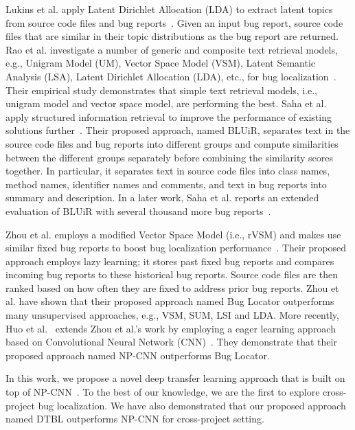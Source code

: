 \vspace{0.2cm} Lukins et al. apply Latent Dirichlet Allocation (LDA) to extract latent topics from source code files and bug reports~\cite{lukins2008source}. Given an input bug report, source code files that are similar in their topic distributions as the bug report are returned. Rao et al. investigate a number of generic and composite text retrieval models, e.g., Unigram Model (UM), Vector Space Model (VSM), Latent Semantic Analysis (LSA), Latent Dirichlet Allocation (LDA), etc., for bug localization~\cite{rao2011retrieval}. Their empirical study demonstrates that simple text retrieval models, i.e., unigram model and vector space model, are performing the best. Saha et al. apply structured information retrieval to improve the performance of existing solutions further~\cite{SahaLKP13}. Their proposed approach, named BLUiR, separates text in the source code files and bug reports into different groups and compute similarities between the different groups separately before combining the similarity scores together. In particular, it separates text in source code files into class names, method names, identifier names and comments, and text in bug reports into summary and description. In a later work, Saha et al.  reports an extended evaluation of BLUiR with several thousand more bug reports~\cite{SahaLKP14}.

\vspace{0.2cm} Zhou et al. employs a modified Vector Space Model (i.e., rVSM) and makes use similar fixed bug reports to boost bug localization performance~\cite{zhou2012should}. Their proposed approach employs lazy learning; it stores past fixed bug reports and compares incoming bug reports to these historical bug reports. Source code files are then ranked based on how often they are fixed to address prior bug reports. Zhou et al. have shown that their proposed approach named Bug Locator outperforms many unsupervised approaches, e.g., VSM, SUM, LSI and LDA. More recently, Huo et al.~\cite{huo2016learning} extends Zhou et al.'s work by employing a eager learning approach based on Convolutional Neural Network (CNN)~\cite{kim2014convolutional}. They demonstrate that their proposed approach named NP-CNN outperforms Bug Locator.

In this work, we propose a novel deep transfer learning approach that is built on top of NP-CNN~\cite{kim2014convolutional}. To the best of our knowledge, we are the first to explore cross-project bug localization. We have also demonstrated that our proposed approach named DTBL outperforms NP-CNN for cross-project setting.

